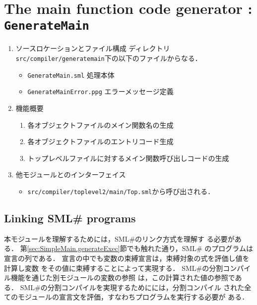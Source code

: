 \documentclass{jbook}
\newcommand{\txt}[2]{#2}
\newcommand{\smlsharp}{SML\#}
\newcommand{\code}[1]{\mbox{\large\tt #1}}
\begin{document}
\else%
\fi%


% 
\chapter{\txt
{メイン関数コード生成モジュール：\code{GenerateMain}}
{The main function code generator : \code{GenerateMain}}
}
\label{chap:GenerateMain}

\ifjp%
\begin{enumerate}
\item ソースロケーションとファイル構成
ディレクトリ \code{src/compiler/generatemain}下の以下のファイルからなる．
\begin{itemize}
\item \code{GenerateMain.sml} 処理本体
\item \code{GenerateMainError.ppg} エラーメッセージ定義
\end{itemize}

\item 機能概要 
\begin{enumerate}
\item 各オブジェクトファイルのメイン関数名の生成
\item 各オブジェクトファイルのエントリコード生成
\item トップレベルファイルに対するメイン関数呼び出しコードの生成
\end{enumerate}

\item 他モジュールとのインターフェイス
\begin{itemize}
\item \code{src/compiler/toplevel2/main/Top.sml}から呼び出される．
\end{itemize}
\end{enumerate}
\else%
\fi%

\section{\txt{\smlsharp{}プログラムのリンク方式}{Linking \smlsharp{} programs}}
\ifjp%

	本モジュールを理解するためには，\smlsharp{}のリンク方式を理解す
る必要がある．
	第\ref{sec:SimpleMain.generateExec}節でも触れた通り，\smlsharp{}
のプログラムは宣言の列である．
	宣言の中でも変数の束縛宣言は，束縛対象の式を評価し値を計算し変数
をその値に束縛することによって実現する．
	\smlsharp{}の分割コンパイル機能を通じた別モジュールの変数の参照
は，この計算された値の参照である．
	\smlsharp{}の分割コンパイルを実現するためにには，分割コンパイル
された全てのモジュールの宣言文を評価，すなわちプログラムを実行する必要が
ある．
\end{document}
